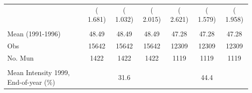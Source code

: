 \begin{tabular}{lcccccc}
 & (    1.681)& (    1.032)& (    2.015)& (    2.621)& (    1.579)& (    1.958) \\ 
  & & & & & & \\ 
Mean (1991-1996)&     48.49&     48.49&     48.49&     47.28&     47.28&     47.28 \\ 
Obs&     15642&     15642&     15642&     12309&     12309&     12309 \\ 
No. Mun&      1422&      1422&      1422&      1119&      1119&      1119 \\ 
  & & & & & & \\ 
Mean Intensity 1999, End-of-year (\%) & \multicolumn{3}{c}{  31.6} & \multicolumn{3}{c}{  44.4} \\ 
\bottomrule
\end{tabular}